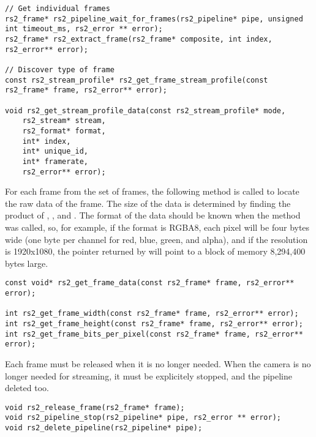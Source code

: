     \begin{lstlisting}[style=CStyle]
// Get individual frames
rs2_frame* rs2_pipeline_wait_for_frames(rs2_pipeline* pipe, unsigned int timeout_ms, rs2_error ** error);
rs2_frame* rs2_extract_frame(rs2_frame* composite, int index, rs2_error** error);

// Discover type of frame
const rs2_stream_profile* rs2_get_frame_stream_profile(const rs2_frame* frame, rs2_error** error);

void rs2_get_stream_profile_data(const rs2_stream_profile* mode, 
    rs2_stream* stream, 
    rs2_format* format, 
    int* index, 
    int* unique_id, 
    int* framerate, 
    rs2_error** error);\end{lstlisting}

    For each frame from the set of frames, the following method is called to locate the raw data of the frame. The size of the data is determined by finding the product of , , and . The format of the data should be known when the  method was called, so, for example, if the format is RGBA8, each pixel will be four bytes wide (one byte per channel for red, blue, green, and alpha), and if the resolution is 1920x1080, the pointer returned by  will point to a block of memory 8,294,400 bytes large.

    \begin{lstlisting}[style=CStyle]
const void* rs2_get_frame_data(const rs2_frame* frame, rs2_error** error);

int rs2_get_frame_width(const rs2_frame* frame, rs2_error** error);
int rs2_get_frame_height(const rs2_frame* frame, rs2_error** error);
int rs2_get_frame_bits_per_pixel(const rs2_frame* frame, rs2_error** error);\end{lstlisting}

    Each frame must be released when it is no longer needed. When the camera is no longer needed for streaming, it must be explicitely stopped, and the pipeline deleted too.
    \begin{lstlisting}[style=CStyle]
void rs2_release_frame(rs2_frame* frame);
void rs2_pipeline_stop(rs2_pipeline* pipe, rs2_error ** error);
void rs2_delete_pipeline(rs2_pipeline* pipe);\end{lstlisting}


